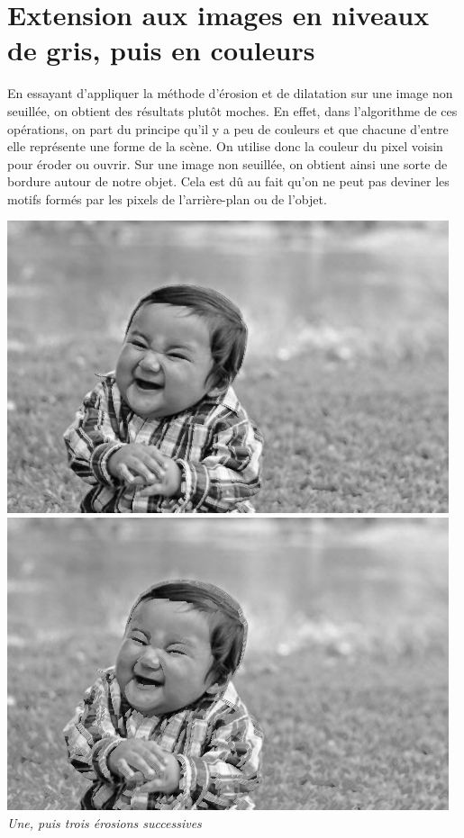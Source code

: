 \documentclass[a4paper,11pt]{article}
\begin{document}
\section{Extension aux images en niveaux de gris, puis en couleurs}
En essayant d'appliquer la méthode d'érosion et de dilatation sur une image non seuillée, on obtient des résultats plutôt moches. En effet, dans l'algorithme de ces opérations, on part du principe qu'il y a peu de couleurs et que chacune d'entre elle représente une forme de la scène. On utilise donc la couleur du pixel voisin pour éroder ou ouvrir. Sur une image non seuillée, on obtient ainsi une sorte de bordure autour de notre objet. Cela est dû au fait qu'on ne peut pas deviner les motifs formés par les pixels de l'arrière-plan ou de l'objet.
\begin{center}
\includegraphics[scale=0.35]{babyerodeg1.png}
\includegraphics[scale=0.35]{babyerodeg3.png}\\
\textit{Une, puis trois érosions successives}

\end{center}
\end{document}
